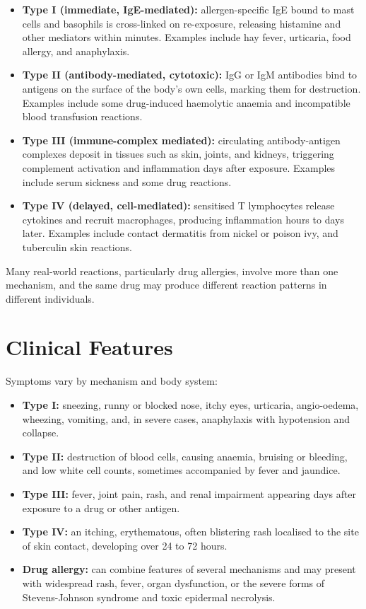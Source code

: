 \begin{itemize}
    \item \textbf{Type I (immediate, IgE-mediated):} allergen-specific IgE bound to mast cells and basophils is cross-linked on re-exposure, releasing histamine and other mediators within minutes. Examples include hay fever, urticaria, food allergy, and anaphylaxis.
    \item \textbf{Type II (antibody-mediated, cytotoxic):} IgG or IgM antibodies bind to antigens on the surface of the body's own cells, marking them for destruction. Examples include some drug-induced haemolytic anaemia and incompatible blood transfusion reactions.
    \item \textbf{Type III (immune-complex mediated):} circulating antibody-antigen complexes deposit in tissues such as skin, joints, and kidneys, triggering complement activation and inflammation days after exposure. Examples include serum sickness and some drug reactions.
    \item \textbf{Type IV (delayed, cell-mediated):} sensitised T lymphocytes release cytokines and recruit macrophages, producing inflammation hours to days later. Examples include contact dermatitis from nickel or poison ivy, and tuberculin skin reactions.
\end{itemize}

Many real-world reactions, particularly drug allergies, involve more than one mechanism, and the same drug may produce different reaction patterns in different individuals.

\section*{Clinical Features}
Symptoms vary by mechanism and body system:

\begin{itemize}
    \item \textbf{Type I:} sneezing, runny or blocked nose, itchy eyes, urticaria, angio-oedema, wheezing, vomiting, and, in severe cases, anaphylaxis with hypotension and collapse.
    \item \textbf{Type II:} destruction of blood cells, causing anaemia, bruising or bleeding, and low white cell counts, sometimes accompanied by fever and jaundice.
    \item \textbf{Type III:} fever, joint pain, rash, and renal impairment appearing days after exposure to a drug or other antigen.
    \item \textbf{Type IV:} an itching, erythematous, often blistering rash localised to the site of skin contact, developing over 24 to 72 hours.
    \item \textbf{Drug allergy:} can combine features of several mechanisms and may present with widespread rash, fever, organ dysfunction, or the severe forms of Stevens-Johnson syndrome and toxic epidermal necrolysis.
\end{itemize}

